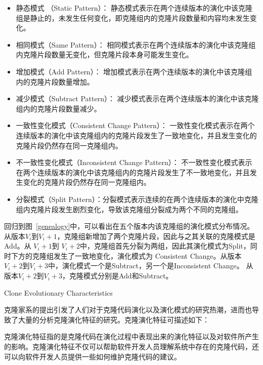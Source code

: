 \begin{itemize}
\item 
{静态模式 （Static Pattern）}：
静态模式表示在两个连续版本的演化中该克隆组是静止的，未发生任何变化，即克隆组内的克隆片段数量和内容均未发生变化。
\item 
{相同模式（Same Pattern）}：
相同模式表示在两个连续版本的演化中该克隆组内克隆片段数量无变化，但克隆片段本身可能发生变化。
\item 
{增加模式（Add Pattern）}：
增加模式表示在两个连续版本的演化中该克隆组内的克隆片段数量增加。
\item 
{减少模式（Subtract Pattern）}：
减少模式表示在两个连续版本的演化中该克隆组内的克隆片段数量减少。
\item 
{ 一致性变化模式（Consistent Change Pattern）}： 
一致性变化模式表示在两个连续版本的演化中该克隆组内的克隆片段发生了一致地变化，并且发生变化的克隆片段仍然存在同一克隆组内。
\item 
{不一致性变化模式（Inconsistent Change Pattern）}：
不一致性变化模式表示在两个连续版本的演化中该克隆组内的克隆片段发生了不一致地变化，并且发生变化的克隆片段仍然存在同一克隆组内。
\item 
{分裂模式（Split Pattern）}：分裂模式表示连续的在两个连续版本的演化中克隆组内克隆片段发生剧烈变化，导致该克隆组分裂成为两个不同的克隆组。
\end{itemize}

回归到图~\ref{genealogy}中，可以看出在五个版本内该克隆组的演化模式分布情况。从版本{$V_i$}到{$V_i+1$}，克隆组新增加了两个克隆片段，因此与之其关联的克隆模式是{Add}。从{ $V_i+1$}到{ $V_i+2$}中，克隆组首先分裂为两组，因此其演化模式为{Split}，同时下方的克隆组发生了一致地变化，演化模式为{ Consistent Change}。从版本{$V_i+2$}到{$V_i+3$}中，演化模式一个是{Subtract}，另一个是{Inconsistent Change}。 从版本{$V_i+2$}到{$V_i+3$}，克隆模式分别是{Add}和{Subtract}。

{Clone Evolutionary Characteristics}

克隆家系的提出引发了人们对于克隆代码演化以及演化模式的研究热潮，进而也导致了大量的分析克隆演化特征的研究。克隆演化特征可描述如下：\\

\begin{definition}
 [{克隆演化特征}]
\label{defn-characteristics}
{
克隆演化特征指的是克隆代码在演化过程中表现出来的演化特征以及对软件所产生的影响。克隆演化特征不仅可以帮助软件开发人员理解系统中存在的克隆代码，还可以向软件开发人员提供一些如何维护克隆代码的建议。
 }
\end {definition}

